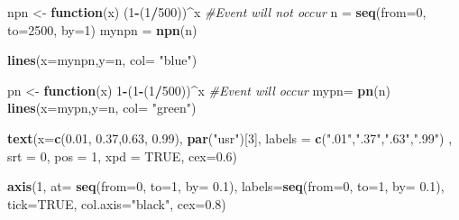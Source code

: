 \documentclass[12pt,oneside]{reedthesis}
\newenvironment{Shaded}{\begin{snugshade}}{\end{snugshade}}
\newcommand{\CommentTok}[1]{\textcolor[rgb]{0.56,0.35,0.01}{\textit{#1}}}
\newcommand{\ControlFlowTok}[1]{\textcolor[rgb]{0.13,0.29,0.53}{\textbf{#1}}}
\newcommand{\DataTypeTok}[1]{\textcolor[rgb]{0.13,0.29,0.53}{#1}}
\newcommand{\DecValTok}[1]{\textcolor[rgb]{0.00,0.00,0.81}{#1}}
\newcommand{\FloatTok}[1]{\textcolor[rgb]{0.00,0.00,0.81}{#1}}
\newcommand{\KeywordTok}[1]{\textcolor[rgb]{0.13,0.29,0.53}{\textbf{#1}}}
\newcommand{\NormalTok}[1]{#1}
\newcommand{\OperatorTok}[1]{\textcolor[rgb]{0.81,0.36,0.00}{\textbf{#1}}}
\newcommand{\OtherTok}[1]{\textcolor[rgb]{0.56,0.35,0.01}{#1}}
\newcommand{\StringTok}[1]{\textcolor[rgb]{0.31,0.60,0.02}{#1}}
\begin{document}
\begin{Shaded}
\begin{Highlighting}[]
\NormalTok{npn <-}\StringTok{ }\ControlFlowTok{function}\NormalTok{(x) (}\DecValTok{1}\OperatorTok{-}\NormalTok{(}\DecValTok{1}\OperatorTok{/}\DecValTok{500}\NormalTok{))}\OperatorTok{^}\NormalTok{x }\CommentTok{#Event will not occur}
\NormalTok{n =}\StringTok{ }\KeywordTok{seq}\NormalTok{(}\DataTypeTok{from=}\DecValTok{0}\NormalTok{, }\DataTypeTok{to=}\DecValTok{2500}\NormalTok{, }\DataTypeTok{by=}\DecValTok{1}\NormalTok{)}
\NormalTok{mynpn =}\StringTok{ }\KeywordTok{npn}\NormalTok{(n)}

\KeywordTok{lines}\NormalTok{(}\DataTypeTok{x=}\NormalTok{mynpn,}\DataTypeTok{y=}\NormalTok{n, }\DataTypeTok{col=} \StringTok{"blue"}\NormalTok{)}

\NormalTok{pn <-}\StringTok{ }\ControlFlowTok{function}\NormalTok{(x) }\DecValTok{1}\OperatorTok{-}\NormalTok{(}\DecValTok{1}\OperatorTok{-}\NormalTok{(}\DecValTok{1}\OperatorTok{/}\DecValTok{500}\NormalTok{))}\OperatorTok{^}\NormalTok{x }\CommentTok{#Event will occur}
\NormalTok{mypn=}\StringTok{ }\KeywordTok{pn}\NormalTok{(n)}
\KeywordTok{lines}\NormalTok{(}\DataTypeTok{x=}\NormalTok{mypn,}\DataTypeTok{y=}\NormalTok{n, }\DataTypeTok{col=} \StringTok{"green"}\NormalTok{)}

\KeywordTok{text}\NormalTok{(}\DataTypeTok{x=}\KeywordTok{c}\NormalTok{(}\FloatTok{0.01}\NormalTok{, }\FloatTok{0.37}\NormalTok{,}\FloatTok{0.63}\NormalTok{, }\FloatTok{0.99}\NormalTok{),  }\KeywordTok{par}\NormalTok{(}\StringTok{"usr"}\NormalTok{)[}\DecValTok{3}\NormalTok{], }\DataTypeTok{labels =} \KeywordTok{c}\NormalTok{(}\StringTok{".01"}\NormalTok{,}\StringTok{".37"}\NormalTok{,}\StringTok{".63"}\NormalTok{,}\StringTok{".99"}\NormalTok{) , }\DataTypeTok{srt =} \DecValTok{0}\NormalTok{, }\DataTypeTok{pos =} \DecValTok{1}\NormalTok{, }\DataTypeTok{xpd =} \OtherTok{TRUE}\NormalTok{, }\DataTypeTok{cex=}\FloatTok{0.6}\NormalTok{)}

\KeywordTok{axis}\NormalTok{(}\DecValTok{1}\NormalTok{, }\DataTypeTok{at=} \KeywordTok{seq}\NormalTok{(}\DataTypeTok{from=}\DecValTok{0}\NormalTok{, }\DataTypeTok{to=}\DecValTok{1}\NormalTok{, }\DataTypeTok{by=} \FloatTok{0.1}\NormalTok{), }\DataTypeTok{labels=}\KeywordTok{seq}\NormalTok{(}\DataTypeTok{from=}\DecValTok{0}\NormalTok{, }\DataTypeTok{to=}\DecValTok{1}\NormalTok{, }\DataTypeTok{by=} \FloatTok{0.1}\NormalTok{), }\DataTypeTok{tick=}\OtherTok{TRUE}\NormalTok{, }\DataTypeTok{col.axis=}\StringTok{"black"}\NormalTok{, }\DataTypeTok{cex=}\FloatTok{0.8}\NormalTok{)}


\end{Highlighting}
\end{Shaded}
\end{document}
